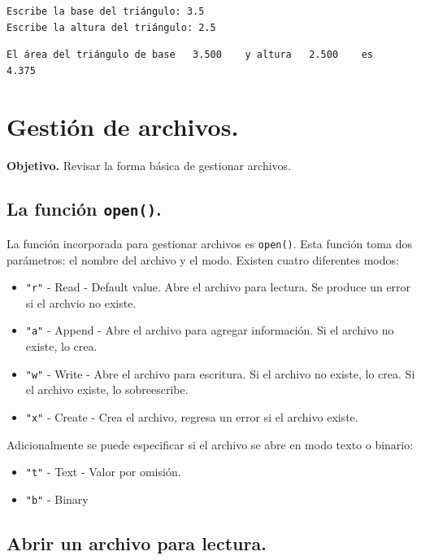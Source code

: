 \documentclass[
  spanish,
  letterpaper,
]{scrbook}
\providecommand{\tightlist}{%
  \setlength{\itemsep}{0pt}\setlength{\parskip}{0pt}}
\theoremstyle{definition}
\theoremstyle{remark}
\begin{document}
\begin{verbatim}
Escribe la base del triángulo: 3.5
Escribe la altura del triángulo: 2.5
\end{verbatim}

\begin{verbatim}
El área del triángulo de base   3.500    y altura   2.500    es   4.375   
\end{verbatim}

\chapter{Gestión de archivos.}\label{sec-g-archivos}

\textbf{Objetivo.} Revisar la forma básica de gestionar archivos.

\section{\texorpdfstring{La función
\texttt{open()}.}{La función open().}}\label{la-funciuxf3n-open.}

La función incorporada para gestionar archivos es \texttt{open()}. Esta
función toma dos parámetros: el nombre del archivo y el modo. Existen
cuatro diferentes modos:

\begin{itemize}
\tightlist
\item
  \texttt{"r"} - Read - Default value. Abre el archivo para lectura. Se
  produce un error si el archvio no existe.
\item
  \texttt{"a"} - Append - Abre el archivo para agregar información. Si
  el archivo no existe, lo crea.
\item
  \texttt{"w"} - Write - Abre el archivo para escritura. Si el archivo
  no existe, lo crea. Si el archivo existe, lo sobreescribe.
\item
  \texttt{"x"} - Create - Crea el archivo, regresa un error si el
  archivo existe.
\end{itemize}

Adicionalmente se puede especificar si el archivo se abre en modo texto
o binario:

\begin{itemize}
\tightlist
\item
  \texttt{"t"} - Text - Valor por omisión.
\item
  \texttt{"b"} - Binary
\end{itemize}

\section{Abrir un archivo para
lectura.}\label{abrir-un-archivo-para-lectura.}
\end{document}
